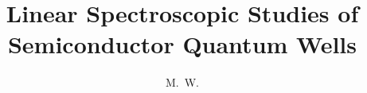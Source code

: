 \documentclass[defaultstyle,12pt]{thesis}%
\title{Linear Spectroscopic Studies of Semiconductor Quantum Wells}
\author{M.~W.}{Day}
\begin{document}
 \ToCisShort %
 \emptyLoT
\LoFisShort %
 

\doublespacing


\end{document}
